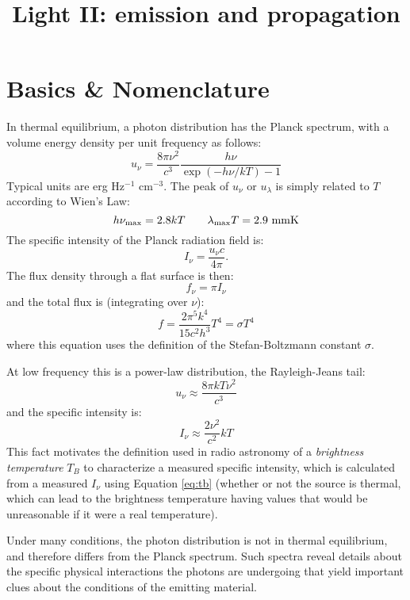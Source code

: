 \title{\bf Light II: emission and propagation}

\section{Basics \& Nomenclature}

In thermal equilibrium, a photon distribution has the Planck spectrum,
with a volume energy density per unit frequency as follows:
\begin{equation}
u_\nu = \frac{8\pi \nu^2}{c^3} \frac{h\nu}{\exp(-h\nu/kT)-1} 
\end{equation}
Typical units are erg Hz$^{-1}$ cm$^{-3}$.
The peak of $u_\nu$ or $u_\lambda$ is simply related to $T$ according
to Wien's Law:
\begin{equation}
\label{eq:wiens}
h\nu_{\rm max} = 2.8 kT \quad\quad
\lambda_{\rm max} T = 2.9 {\rm ~mm} {\rm K} 
\end{equation}
The specific intensity of the Planck radiation field is:
\begin{equation}
I_\nu = \frac{u_\nu c}{4\pi}.
\end{equation}
The flux density through a flat surface is then:
\begin{equation}
f_\nu = \pi I_\nu 
\end{equation}
and the total flux is (integrating over $\nu$):
\begin{equation}
f = \frac{2\pi^5 k^4}{15 c^2 h^3} T^4 = \sigma T^4
\end{equation}
where this equation uses the definition of the Stefan-Boltzmann
constant $\sigma$.

At low frequency this is a power-law distribution, the Rayleigh-Jeans
tail:
\begin{equation}
u_\nu \approx \frac{8\pi k T \nu^2 }{c^3}
\end{equation}
and the specific intensity is:
\begin{equation}
\label{eq:tb}
I_\nu \approx \frac{2 \nu^2 }{c^2} kT
\end{equation}
This fact motivates the definition used in radio astronomy of a {\it
brightness temperature} $T_B$ to characterize a measured specific
intensity, which is calculated from a measured $I_\nu$ using Equation
\ref{eq:tb} (whether or not the source is thermal, which can lead to
the brightness temperature having values that would be unreasonable if
it were a real temperature).

Under many conditions, the photon distribution is not in thermal
equilibrium, and therefore differs from the Planck spectrum. Such
spectra reveal details about the specific physical interactions the
photons are undergoing that yield important clues about the conditions
of the emitting material.

